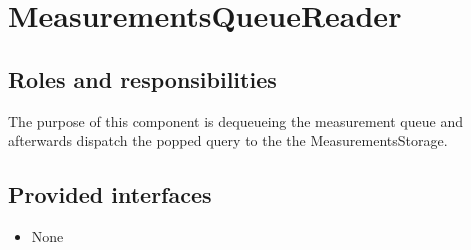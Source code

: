\section{MeasurementsQueueReader}
\label{element:measurements-queue-reader}

\subsection{Roles and responsibilities}

\npar The purpose of this component is dequeueing the measurement queue and
afterwards dispatch the popped query to the the MeasurementsStorage.

\subsection{Provided interfaces}

\begin{itemize}
  \item None
\end{itemize}
